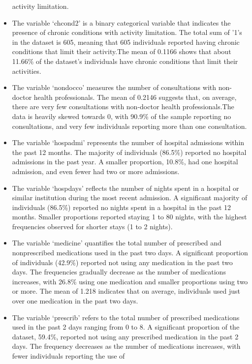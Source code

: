 \documentclass[
]{article}
\begin{document}
\begin{itemize}
  activity limitation.
\item
  The variable `chcond2' is a binary categorical variable that indicates
  the presence of chronic conditions with activity limitation. The total
  sum of '1's in the dataset is 605, meaning that 605 individuals
  reported having chronic conditions that limit their activity.The mean
  of 0.1166 shows that about 11.66\% of the dataset's individuals have
  chronic conditions that limit their activities.
\item
  The variable `nondocco' measures the number of consultations with
  non-doctor health professionals. The mean of 0.2146 suggests that, on
  average, there are very few consultations with non-doctor health
  professionals.The data is heavily skewed towards 0, with 90.9\% of the
  sample reporting no consultations, and very few individuals reporting
  more than one consultation.
\item
  The variable `hospadmi' represents the number of hospital admissions
  within the past 12 months. The majority of individuals (86.5\%)
  reported no hospital admissions in the past year. A smaller
  proportion, 10.8\%, had one hospital admission, and even fewer had two
  or more admissions.
\item
  The variable `hospdays' reflects the number of nights spent in a
  hospital or similar institution during the most recent admission. A
  significant majority of individuals (86.5\%) reported no nights spent
  in a hospital in the past 12 months. Smaller proportions reported
  staying 1 to 80 nights, with the highest frequencies observed for
  shorter stays (1 to 2 nights).
\item
  The variable `medicine' quantifies the total number of prescribed and
  nonprescribed medications used in the past two days. A significant
  proportion of individuals (42.9\%) reported not using any medication
  in the past two days. The frequencies gradually decrease as the number
  of medications increases, with 26.8\% using one medication and smaller
  proportions using two or more. The mean of 1.218 indicates that on
  average, individuals used just over one medication in the past two
  days.
\item
  The variable `prescrib' refers to the total number of prescribed
  medications used in the past 2 days ranging from 0 to 8. A significant
  proportion of the dataset, 59.4\%, reported not using any prescribed
  medication in the past 2 days. The frequency decreases as the number
  of medications increases, with fewer individuals reporting the use of

\end{itemize}
\end{document}
